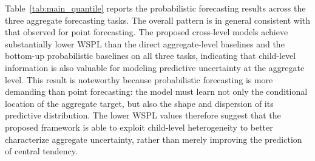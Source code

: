 \documentclass[12pt]{article}
\begin{document}
Table~\ref{tab:main_quantile} reports the probabilistic forecasting results across the three aggregate forecasting tasks. The overall pattern is in general consistent with that observed for point forecasting. The proposed cross-level models achieve substantially lower WSPL than the direct aggregate-level baselines and the bottom-up probabilistic baselines on all three tasks, indicating that child-level information is also valuable for modeling predictive uncertainty at the aggregate level. This result is noteworthy because probabilistic forecasting is more demanding than point forecasting: the model must learn not only the conditional location of the aggregate target, but also the shape and dispersion of its predictive distribution. The lower WSPL values therefore suggest that the proposed framework is able to exploit child-level heterogeneity to better characterize aggregate uncertainty, rather than merely improving the prediction of central tendency.
\end{document}
